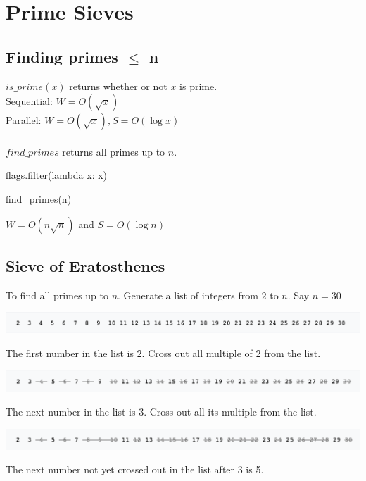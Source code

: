 \documentclass[12pt]{article}
\begin{document}
\MakeScribeTop

\section{Prime Sieves}

\subsection{Finding primes $\leq$ n}

$is\_prime(x)$ returns whether or not $x$ is prime.\\
Sequential: $W = O(\sqrt{x})$\\
Parallel: $W = O(\sqrt{x}), S = O(\log x)$\\ \\
$find\_primes$ returns all primes up to $n$.

\begin{algorithm}[H]
\SetAlgoLined
 \Return flags.filter(lambda x: x)  
 \caption{find\_primes(n)}
\end{algorithm}
$W = O(n\sqrt{n})$ and 
$S =O(\log n)$

\subsection{Sieve of Eratosthenes}

To find all primes up to $n$. Generate a list of integers from $2$ to $n$. Say $n=30$

\includegraphics[scale=0.5]{img0}

The first number in the list is $2$. Cross out all multiple of 2 from the list.

\includegraphics[scale=0.5]{img1}

The next number in the list is $3$. Cross out all its multiple from the list.

\includegraphics[scale=0.5]{img2}

The next number not yet crossed out in the list after 3 is 5. 
\end{document}

